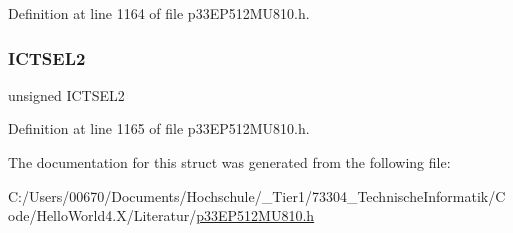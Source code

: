 Definition at line 1164 of file p33\+E\+P512\+M\+U810.\+h.

\mbox{\label{structtag_i_c12_c_o_n1_b_i_t_s_a47d80892d449e6edbd5ba2ba9ff06deb}} 
\subsubsection{\texorpdfstring{I\+C\+T\+S\+E\+L2}{ICTSEL2}}
{\footnotesize\ttfamily unsigned I\+C\+T\+S\+E\+L2}



Definition at line 1165 of file p33\+E\+P512\+M\+U810.\+h.



The documentation for this struct was generated from the following file\+:\begin{DoxyCompactItemize}
\item 
C\+:/\+Users/00670/\+Documents/\+Hochschule/\+\_\+\+Tier1/73304\+\_\+\+Technische\+Informatik/\+Code/\+Hello\+World4.\+X/\+Literatur/\hyperlink{p33_e_p512_m_u810_8h}{p33\+E\+P512\+M\+U810.\+h}\end{DoxyCompactItemize}
